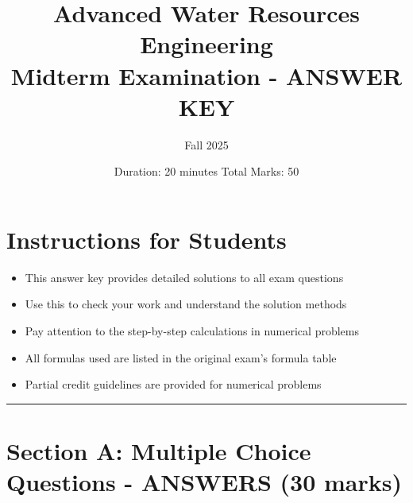 \documentclass[11pt,a4paper]{article}
\title{\textbf{Advanced Water Resources Engineering\\
Midterm Examination - ANSWER KEY}}
\author{Fall 2025}
\date{Duration: 20 minutes \quad Total Marks: 50}
\begin{document}
\maketitle

\vspace{-0.5cm}

\section*{Instructions for Students}
\begin{itemize}[nosep]
    \item This answer key provides detailed solutions to all exam questions
    \item Use this to check your work and understand the solution methods
    \item Pay attention to the step-by-step calculations in numerical problems
    \item All formulas used are listed in the original exam's formula table
    \item Partial credit guidelines are provided for numerical problems
\end{itemize}

\hrule
\vspace{0.3cm}

\section*{Section A: Multiple Choice Questions - ANSWERS (30 marks)}
\end{document}
